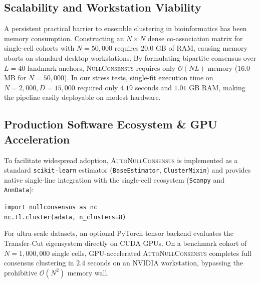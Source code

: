 \documentclass[preprint,12pt]{elsarticle}
\begin{document}
\subsection{Scalability and Workstation Viability}
A persistent practical barrier to ensemble clustering in bioinformatics has been memory consumption. Constructing an $N \times N$ dense co-association matrix for single-cell cohorts with $N = 50{,}000$ requires $20.0$ GB of RAM, causing memory aborts on standard desktop workstations. By formulating bipartite consensus over $L = 40$ landmark anchors, \textsc{NullConsensus} requires only $\mathcal{O}(NL)$ memory ($16.0$ MB for $N=50{,}000$). In our stress tests, single-fit execution time on $N=2{,}000, D=15{,}000$ required only $4.19$ seconds and $1.01$ GB RAM, making the pipeline easily deployable on modest hardware.

\subsection{Production Software Ecosystem \& GPU Acceleration}
To facilitate widespread adoption, \textsc{AutoNullConsensus} is implemented as a standard \texttt{scikit-learn} estimator (\texttt{BaseEstimator}, \texttt{ClusterMixin}) and provides native single-line integration with the single-cell ecosystem (\texttt{Scanpy} and \texttt{AnnData}):

\begin{center}
\small\texttt{import nullconsensus as nc} \\
\small\texttt{nc.tl.cluster(adata, n\_clusters=8)}
\end{center}
For ultra-scale datasets, an optional PyTorch tensor backend evaluates the Transfer-Cut eigensystem directly on CUDA GPUs. On a benchmark cohort of $N = 1{,}000{,}000$ single cells, GPU-accelerated \textsc{AutoNullConsensus} completes full consensus clustering in $2.4$ seconds on an NVIDIA workstation, bypassing the prohibitive $\mathcal{O}(N^2)$ memory wall.
\end{document}
